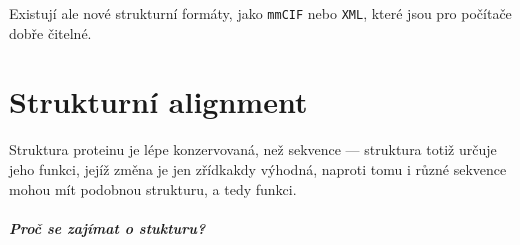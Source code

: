 \documentclass[DIV=8]{scrreprt}
\newcommand{\inlinecode}{\texttt}
\begin{document}
Existují ale nové strukturní formáty, jako \inlinecode{mmCIF} nebo \inlinecode{XML}, které jsou pro počítače dobře čitelné.

\chapter{Strukturní alignment} \label{Strukturní alignment}


Struktura proteinu je lépe konzervovaná, než sekvence --- struktura totiž určuje jeho funkci, jejíž změna je jen zřídkakdy výhodná, naproti tomu i různé sekvence mohou mít podobnou strukturu, a tedy funkci.

\paragraph{Proč se zajímat o stukturu?}
\end{document}
